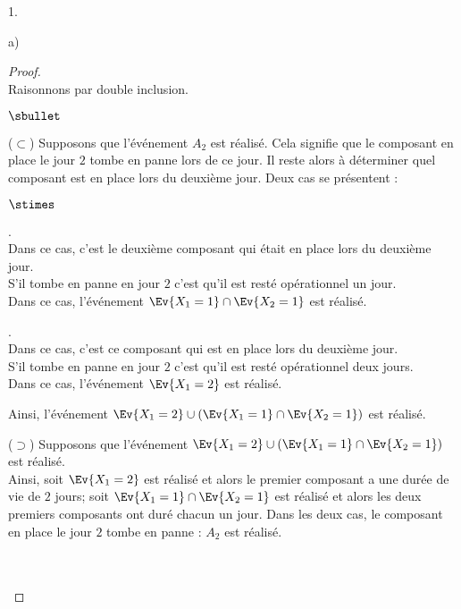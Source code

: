 \documentclass[11pt]{article}%
\begin{document}
\begin{noliste}{1.}
\begin{noliste}{a)}
      \begin{proof}~\\%
        Raisonnons par double inclusion.
        \begin{liste}{$\sbullet$}
        \item[($\subset$)] Supposons que l'événement $A_2$ est
          réalisé. Cela signifie que le composant en place le jour $2$
          tombe en panne lors de ce jour. Il reste alors à déterminer
          quel composant est en place lors du deuxième jour. Deux cas
          se présentent :
          \begin{noliste}{$\stimes$}
          \item {}.\\
            Dans ce cas, c'est le deuxième composant qui était en
            place lors du deuxième jour.\\
            S'il tombe en panne en jour $2$ c'est qu'il est resté
            opérationnel un jour.\\[.1cm]
            Dans ce cas, l'événement $\Ev{X_1=1} \cap \Ev{X_2=1}$ est
            réalisé.
          
          \item {}.\\
            Dans ce cas, c'est ce composant qui est en place lors du
            deuxième jour.\\
            S'il tombe en panne en jour $2$ c'est qu'il est resté
            opérationnel deux jours.\\[.1cm]
            Dans ce cas, l'événement $\Ev{X_1=2}$ est réalisé.
          \end{noliste}
          Ainsi, l'événement $\Ev{X_1=2} \cup \left(\Ev{X_1=1} \cap
            \Ev{X_2=1} \right)$ est réalisé.
        \item[($\supset$)] Supposons que l'événement $\Ev{X_1=2} \cup
          \left(\Ev{X_1=1} \cap \Ev{X_2=1} \right)$ est réalisé.\\
          Ainsi, soit $\Ev{X_1 = 2}$ est réalisé et alors le premier
          composant a une durée de vie de $2$ jours; soit $\Ev{X_1=1}
          \cap \Ev{X_2=1}$ est réalisé et alors les deux premiers
          composants ont duré chacun un jour. Dans les deux cas, le
          composant en place le jour $2$ tombe en panne : $A_2$ est
          réalisé.
        \end{liste}
        ~\\[-1.1cm]
        ~\\[-1.4cm]
      \end{proof}


\end{noliste}
\end{noliste}
\end{document}
